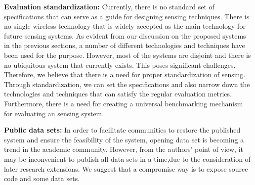 \textbf{Evaluation standardization:} Currently, there is no standard set of specifications that can serve as a guide for designing sensing techniques. There is no single wireless technology that is widely accepted as the main technology for future sensing systems. As evident from our discussion on the proposed systems in the previous sections, a number of different technologies and techniques have been used for the purpose. However, most of the systems are disjoint and there is no ubiquitous system that currently exists. This poses significant challenges. Therefore, we believe that there is a need for proper standardization of sensing. Through standardization, we can set the specifications and also narrow down the technologies and techniques that can satisfy the regular evaluation metrics. Furthermore, there is a need for creating a universal benchmarking mechanism for evaluating an sensing system.

\textbf{Public data sets: }In order to facilitate communities to restore the published system and ensure the feasibility of the system, opening data set is becoming a trend in the academic community. However, from the authors' point of view, it may be inconvenient to publish all data sets in a time,due to the consideration of later research extensions. We suggest that a compromise way is to expose source code and some data sets.

